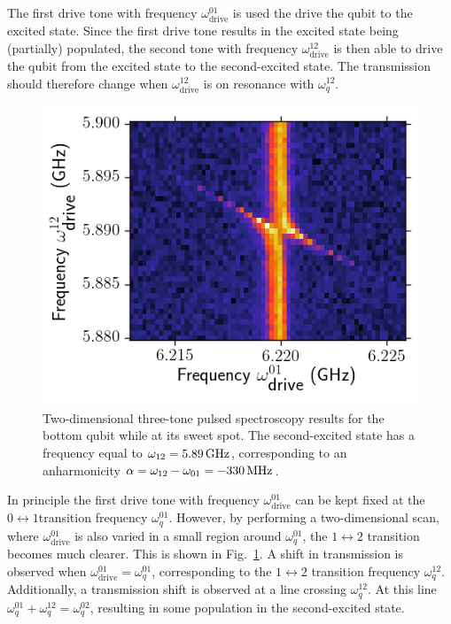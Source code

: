         The first drive tone with frequency $\omega_\text{drive}^{01}$ is used the drive the qubit to the excited state. Since the first drive tone results in the excited state being (partially) populated, the second tone with frequency $\omega_\text{drive}^{12}$ is then able to drive the qubit from the excited state to the second-excited state. The transmission should therefore change when $\omega_\text{drive}^{12}$ is on resonance with $\omega_q^{12}$.

        \begin{figure}[tb]
          \centering
          \includegraphics[width=.6\textwidth]{Figures/Qubit characterization/second transition spec.png}
          \caption{Two-dimensional three-tone pulsed spectroscopy results for the bottom qubit while at its sweet spot. The second-excited state has a frequency equal to $\omega_{12}=\text{\ensuremath{\SI{5.89}{\giga \hertz}}}$, corresponding to an anharmonicity $\alpha= \omega_{12}-\omega_{01}=\text{\ensuremath{\SI{-330}{\mega \hertz}}}$.}
          \label{fig:Second-excited-state spectroscopy}
        \end{figure}

        In principle the first drive tone with frequency $\omega_\text{drive}^{01}$ can be kept fixed at the $0 \leftrightarrow 1$transition frequency $\omega_q^{01}$. However, by performing a two-dimensional scan, where $\omega_\text{drive}^{01}$ is also varied in a small region around $\omega_q^{01}$, the $1 \leftrightarrow 2$ transition becomes much clearer. This is shown in Fig.~\ref{fig:Second-excited-state spectroscopy}. A shift in transmission is observed when $\omega_\text{drive}^{01} = \omega_q^{01}$, corresponding to the $1 \leftrightarrow2$ transition frequency $\omega_q^{12}$. Additionally, a transmission shift is observed at a line crossing $\omega_q^{12}$. At this line $\omega_q^{01} + \omega_q^{12} = \omega_q^{02}$, resulting in some population in the second-excited state.

